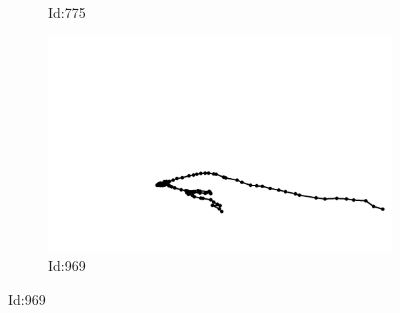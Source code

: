\documentclass[12pt,twoside]{report}
\begin{document}
\begin{figure}
\begin{subfigure}[b]{0.20\textwidth}
\caption{Id:775}
\end{subfigure}
\begin{subfigure}[b]{0.20\textwidth}
\centering
\includegraphics[width=\textwidth]{../../trajectories/969.png}
\caption{Id:969}
\end{subfigure}
\end{figure}
\end{document}

